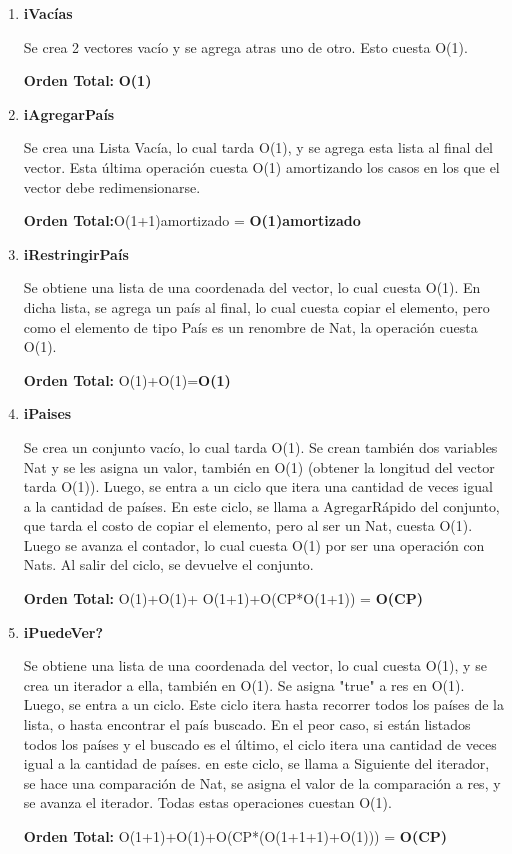 \vspace*{1em}
\begin{enumerate}

\item\textbf{iVacías}
\par Se crea 2 vectores vacío y se agrega atras uno de otro. Esto cuesta O(1).
\par \textbf{Orden Total:} \textbf{O(1)}

\item \textbf{iAgregarPaís}
\par Se crea una Lista Vacía, lo cual tarda O(1), y se agrega esta lista al final del vector. Esta última operación cuesta O(1) amortizando los casos en los que el vector debe redimensionarse.
\par\textbf{Orden Total:}O(1+1)amortizado = \textbf{O(1)amortizado}

\item\textbf{iRestringirPaís}
\par Se obtiene una lista de una coordenada del vector, lo cual cuesta O(1). En dicha lista, se agrega un país al final, lo cual cuesta copiar el elemento, pero como el elemento de tipo País es un renombre de Nat, la operación cuesta O(1).
\par\textbf{Orden Total:} O(1)+O(1)=\textbf{O(1)}

\item\textbf{iPaises}
\par Se crea un conjunto vacío, lo cual tarda O(1). Se crean también dos variables Nat y se les asigna un valor, también en O(1) (obtener la longitud del vector tarda O(1)). Luego, se entra a un ciclo que itera una cantidad de veces igual a la cantidad de países. En este ciclo, se llama a AgregarRápido del conjunto, que tarda el costo de copiar el elemento, pero al ser un Nat, cuesta O(1). Luego se avanza el contador, lo cual cuesta O(1) por ser una operación con Nats. Al salir del ciclo, se devuelve el conjunto.
\par\textbf{Orden Total:} O(1)+O(1)+ O(1+1)+O(CP*O(1+1)) = \textbf{O(CP)}

\item\textbf{iPuedeVer?}
\par Se obtiene una lista de una coordenada del vector, lo cual cuesta O(1), y se crea un iterador a ella, también en O(1). Se asigna "true" a res en O(1). Luego, se entra a un ciclo. Este ciclo itera hasta recorrer todos los países de la lista, o hasta encontrar el país buscado. En el peor caso, si están listados todos los países y el buscado es el último, el ciclo itera una cantidad de veces igual a la cantidad de países. en este ciclo, se llama a Siguiente del iterador, se hace una comparación de Nat, se asigna el valor de la comparación a res, y se avanza el iterador. Todas estas operaciones cuestan O(1).
\par\textbf{Orden Total:} O(1+1)+O(1)+O(CP*(O(1+1+1)+O(1))) = \textbf{O(CP)}


\end{enumerate}
